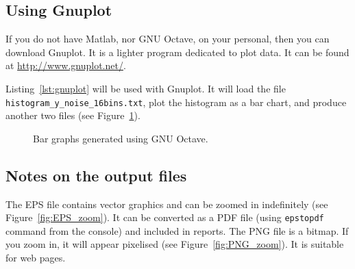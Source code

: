 \documentclass[english,a4paper,12pt,oneside]{article}
\begin{document}
\subsection*{Using Gnuplot}

If you do not have Matlab, nor GNU Octave, on your personal, then you can download Gnuplot. 
It is a lighter program dedicated to plot data. 
It can be found at \url{http://www.gnuplot.net/}. 


Listing~\ref{lst:gnuplot} will be used with Gnuplot. It will load the file \verb+histogram_y_noise_16bins.txt+, plot the histogram as a bar chart,  and produce another two files (see Figure~\ref{fig:gnuplot}).


\begin{figure}[!h]
\centering
{}\hfill
{}
\caption{\label{fig:gnuplot}Bar graphs generated using GNU Octave.}
\end{figure}

\subsection*{Notes on the output files}

The EPS file contains vector graphics and can be zoomed in indefinitely (see Figure~\ref{fig:EPS_zoom}). 
It can be converted as a PDF file (using \verb+epstopdf+ command from the console) and included in reports. 
The PNG file is a bitmap. If you zoom in, it will appear pixelised (see Figure~\ref{fig:PNG_zoom}). 
It is suitable for web pages.
\end{document}
